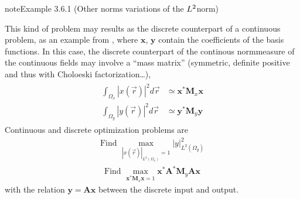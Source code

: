 \documentclass[letterpaper,10pt,english]{jupyterBook}
\begin{document}
\begin{sphinxadmonition}{note}{Example 3.6.1 (Other norms \sphinxhyphen{} variations of the \protect\(L^2\protect\)\sphinxhyphen{}norm)}



\sphinxAtStartPar
This kind of problem may results as the discrete counterpart of a continuous problem, as an example from {\hyperref[\detokenize{ch/pde/fem:pde-fem}]{}}, where \(\mathbf{x}\), \(\mathbf{y}\) contain the coefficients of the basis functions. In this case, the discrete counterpart of the continous norm\sphinxhyphen{}measure of the continuous fields may involve a “mass matrix” (symmetric, definite positive \sphinxhyphen{} and thus with Choloeski factorization…),
\begin{equation*}
\begin{split}\begin{aligned}
  \int_{\Omega_x} |x(\vec{r})|^2 d \vec{r} & \simeq \mathbf{x}^* \mathbf{M}_x \mathbf{x} \\
  \int_{\Omega_y} |y(\vec{r})|^2 d \vec{r} & \simeq \mathbf{y}^* \mathbf{M}_y \mathbf{y}
\end{aligned}\end{split}
\end{equation*}
\sphinxAtStartPar
Continuous and discrete optimization problems are
\begin{equation*}
\begin{split}\text{Find } \max_{|x(\vec{r})|_{L^2(\Omega_x)}=1} |y|^2_{L^2(\Omega_y)} \end{split}
\end{equation*}\begin{equation*}
\begin{split}\text{Find } \max_{\mathbf{x}^*\mathbf{M}_x  \mathbf{x}=1} \mathbf{x}^* \mathbf{A}^* \mathbf{M}_y \mathbf{A} \mathbf{x} \end{split}
\end{equation*}
\sphinxAtStartPar
with the relation \(\mathbf{y} = \mathbf{A} \mathbf{x}\) between the discrete input and output.


\end{sphinxadmonition}
\end{document}
